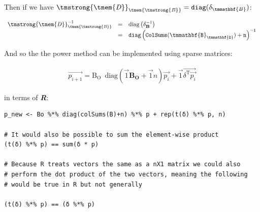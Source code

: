 \documentclass[11pt]{article}
\begin{document}
Then if we have \(\mathit{{\tmstrong{{\tmem{D}}}}}_{\mathit{{\tmem{{\tmstrong{B}}}}}} =
\mathtt{diag} (\delta_{\tmmathbf{B}}) \mathtt{}\):


\[ \begin{array}{lll}
     \mathit{{\tmstrong{{\tmem{D}}}}}_{\mathit{{\tmem{{\tmstrong{B}}}}}}^{- 1}
     & = & \mathrm{diag} \left( \delta^{- 1}_{\mathbf{B}} \right)\\
     & = & \mathtt{diag} \left( \mathtt{ColSums}
     (\mathtt{\tmmathbf{B}_{\tmmathbf{O}}}) + \mathtt{n}
     \right)^{\mathtt{- 1}}
   \end{array} \]

And so the the power method can be implemented using sparse matrices:

\begin{align}
\vec{p_{i+1}} = \mathrm{B_{O}} \enspace \mathrm{diag}\left( \vec{1} \mathbf{B_{O}} + \vec{1}n \right) \vec{p_{i}} + \vec{1} \vec{\delta^{\mathrm{T}}\vec{p_{i}}}
\end{align}

in terms of \textbf{\emph{R}}:

\begin{verbatim}
p_new <- Bo %*% diag(colSums(B)+n) %*% p + rep(t(δ) %*% p, n)

# It would also be possible to sum the element-wise product
(t(δ) %*% p) == sum(δ * p)

# Because R treats vectors the same as a nX1 matrix we could also
# perform the dot product of the two vectors, meaning the following
# would be true in R but not generally

(t(δ) %*% p) == (δ %*% p)
\end{verbatim}
\end{document}
